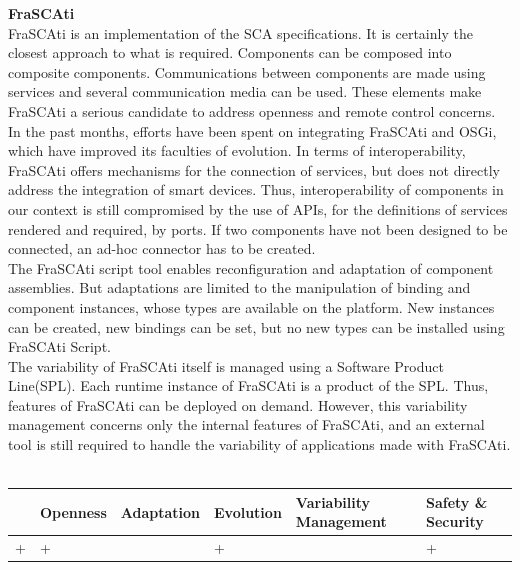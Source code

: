 \vspace{0.5cm}

{\bf FraSCAti}\\

FraSCAti\cite{Melisson:2010} is an implementation of the SCA specifications. It is certainly the closest approach to what is required. Components can be composed into composite components. Communications between components are made using services and several communication media can be used. These elements make FraSCAti a serious candidate to address openness and remote control concerns.\\
In the past months, efforts have been spent on integrating FraSCAti and OSGi, which have improved its faculties of evolution. In terms of interoperability, FraSCAti offers mechanisms for the connection of services, but does not directly address the integration of smart devices. Thus, interoperability of components in our context is still compromised by the use of APIs, for the definitions of services rendered and required, by ports. If two components have not been designed to be connected, an ad-hoc connector has to be created.\\
The FraSCAti script tool enables reconfiguration and adaptation of component assemblies. But adaptations are limited to the manipulation of binding and component instances, whose types are available on the platform. New instances can be created, new bindings can be set, but no new types can be installed using FraSCAti Script.\\
The variability of FraSCAti itself is managed using a Software Product Line(SPL). Each runtime instance of FraSCAti is a product of the SPL. Thus, features of FraSCAti can be deployed on demand. However, this variability management concerns only the internal features of FraSCAti, and an external tool is still required to handle the variability of applications made with FraSCAti.\\
\\
\begin{tabular}{ >{\centering}m{}| >{\centering}m{} >{\centering}m{}| >{\centering}m{} >{\centering}m{}| >{\centering\arraybackslash}m{}}
{\tiny Interoperability} & {\tiny Openness} & {\tiny Adaptation} & {\tiny Evolution} & {\tiny Variability Management} & {\tiny Safety \& Security}\\
 \hline
 + & + &  & + &  & + \\ 
  \hline
\end{tabular}\\

